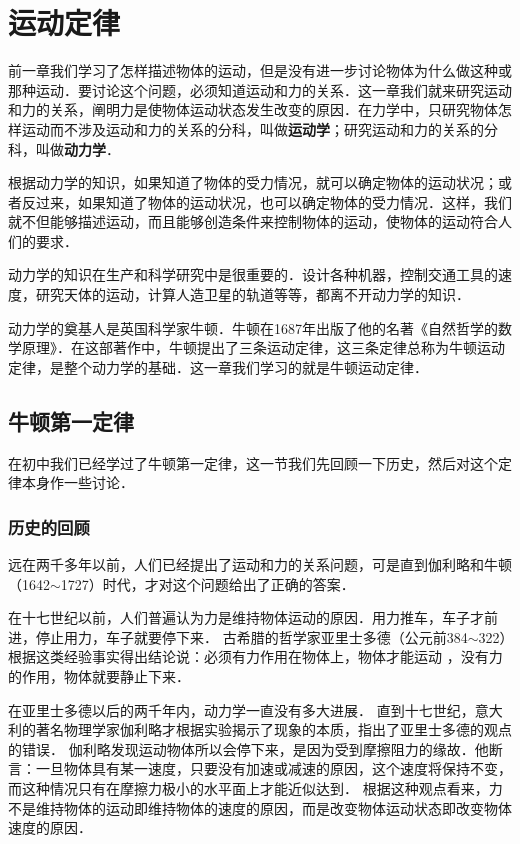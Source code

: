 \chapter{运动定律}\label{chapter-law-of-motion}


% 
前一章我们学习了怎样描述物体的运动，但是没有进一步讨论物体为什么做这种或那种运动．要讨论这个问题，必须知道运动和力的关系．这一章我们就来研究运动和力的关系，阐明力是使物体运动状态发生改变的原因．在力学中，只研究物体怎样运动而不涉及运动和力的关系的分科，叫做\textbf{运动学}；研究运动和力的关系的分科，叫做\textbf{动力学}．

根据动力学的知识，如果知道了物体的受力情况，就可以确定物体的运动状况；或者反过来，如果知道了物体的运动状况，也可以确定物体的受力情况．这样，我们就不但能够描述运动，而且能够创造条件来控制物体的运动，使物体的运动符合人们的要求．

动力学的知识在生产和科学研究中是很重要的．设计各种机器，控制交通工具的速度，研究天体的运动，计算人造卫星的轨道等等，都离不开动力学的知识．

动力学的奠基人是英国科学家牛顿．牛顿在1687年出版了他的名著《自然哲学的数学原理》．在这部著作中，牛顿提出了三条运动定律，这三条定律总称为牛顿运动定律，是整个动力学的基础．这一章我们学习的就是牛顿运动定律．

\section{牛顿第一定律}
在初中我们已经学过了牛顿第一定律，这一节我们先回顾一下历史，然后对这个定律本身作一些讨论．

\subsection{历史的回顾} 
远在两千多年以前，人们已经提出了运动和力的关系问题，可是直到伽利略和牛顿（1642$\sim$1727）时代，才对这个问题给出了正确的答案．

在十七世纪以前，人们普遍认为力是维持物体运动的原因．用力推车，车子才前进，停止用力，车子就要停下来．
古希腊的哲学家亚里士多德（公元前384$\sim$322）根据这类经验事实得出结论说：必须有力作用在物体上，物体才能运动
，没有力的作用，物体就要静止下来．

在亚里士多德以后的两千年内，动力学一直没有多大进展．
直到十七世纪，意大利的著名物理学家伽利略才根据实验揭示了现象的本质，指出了亚里士多德的观点的错误．
伽利略发现运动物体所以会停下来，是因为受到摩擦阻力的缘故．他断言：一旦物体具有某一速度，只要没有加速或减速的原因，这个速度将保持不变，而这种情况只有在摩擦力极小的水平面上才能近似达到．
根据这种观点看来，力不是维持物体的运动即维持物体的速度的原因，而是改变物体运动状态即改变物体速度的原因．

